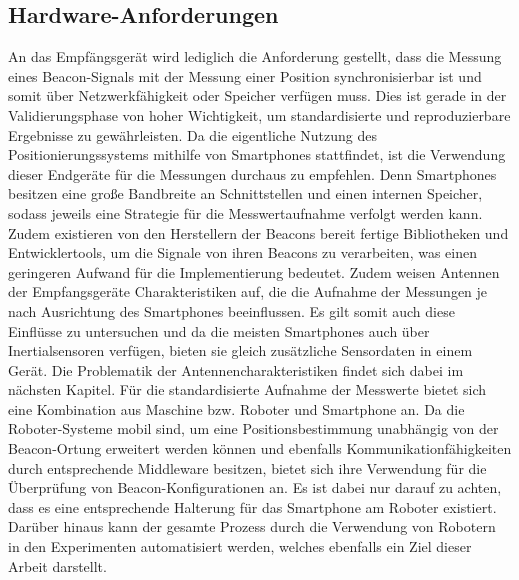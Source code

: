 \subsection{Hardware-Anforderungen}
An das Empfängsgerät wird lediglich die Anforderung gestellt, dass die Messung eines Beacon-Signals mit der Messung einer Position synchronisierbar ist und somit über Netzwerkfähigkeit oder Speicher verfügen muss. Dies ist gerade in der Validierungsphase von hoher Wichtigkeit, um standardisierte und reproduzierbare Ergebnisse zu gewährleisten. Da die eigentliche Nutzung des Positionierungssystems mithilfe von Smartphones stattfindet, ist die Verwendung dieser Endgeräte für die Messungen durchaus zu empfehlen. Denn Smartphones besitzen eine große Bandbreite an Schnittstellen und einen internen Speicher, sodass jeweils eine Strategie für die Messwertaufnahme verfolgt werden kann. Zudem existieren von den Herstellern der Beacons bereit fertige Bibliotheken und Entwicklertools, um die Signale von ihren Beacons zu verarbeiten, was einen geringeren Aufwand für die Implementierung bedeutet. Zudem weisen Antennen der Empfangsgeräte Charakteristiken auf, die die Aufnahme der Messungen je nach Ausrichtung des Smartphones beeinflussen. Es gilt somit auch diese Einflüsse zu untersuchen und da die meisten Smartphones auch über Inertialsensoren verfügen, bieten sie gleich zusätzliche Sensordaten in einem Gerät. Die Problematik der Antennencharakteristiken findet sich dabei im nächsten Kapitel. Für die standardisierte Aufnahme der Messwerte bietet sich eine Kombination aus Maschine bzw. Roboter und Smartphone an. Da die Roboter-Systeme mobil sind, um eine Positionsbestimmung unabhängig von der Beacon-Ortung erweitert werden können und ebenfalls Kommunikationfähigkeiten durch entsprechende Middleware besitzen, bietet sich ihre Verwendung für die Überprüfung von Beacon-Konfigurationen an. Es ist dabei nur darauf zu achten, dass es eine entsprechende Halterung für das Smartphone am Roboter existiert. Darüber hinaus kann der gesamte Prozess durch die Verwendung von Robotern in den Experimenten automatisiert werden, welches ebenfalls ein Ziel dieser Arbeit darstellt.  
